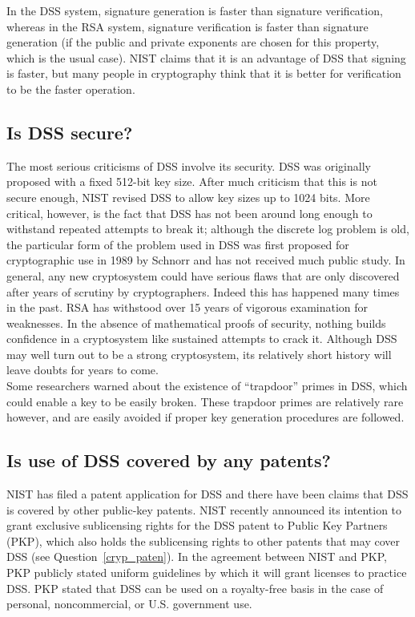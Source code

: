 In the DSS system, signature generation is faster than signature
verification, whereas in the RSA system, signature verification is
faster than signature generation (if the public and private exponents
are chosen for this property, which is the usual case). NIST claims
that it is an advantage of DSS that signing is faster, but many people
in cryptography think that it is better for verification to be the
faster operation.

\subsection{Is DSS secure?}

The most serious criticisms of DSS involve its security. DSS was
originally proposed with a fixed 512-bit key size. After much criticism
that this is not secure enough, NIST revised DSS to allow key sizes up
to 1024 bits. More critical, however, is the fact that DSS has not been
around long enough to withstand repeated attempts to break it; although
the discrete log problem is old, the particular form of the problem
used in DSS was first proposed for cryptographic use in 1989 by Schnorr
and has not received much public study. In general, any new
cryptosystem could have serious flaws that are only discovered after
years of scrutiny by cryptographers. Indeed this has happened many
times in the past. RSA has withstood over 15 years of vigorous
examination for weaknesses. In the absence of mathematical proofs of
security, nothing builds confidence in a cryptosystem like sustained
attempts to crack it. Although DSS may well turn out to be a strong
cryptosystem, its relatively short history will leave doubts for years
to come.\\

Some researchers warned about the existence of ``trapdoor'' primes in
DSS, which could enable a key to be easily broken. These trapdoor
primes are relatively rare however, and are easily avoided if proper
key generation procedures are followed.

\subsection{Is use of DSS covered by any patents?}

NIST has filed a patent application for DSS and there have been claims that
DSS is covered by other public-key patents. NIST recently announced its
intention to grant exclusive sublicensing rights for the DSS patent to
Public Key Partners (PKP), which also holds the sublicensing rights to
other patents that may cover DSS (see Question~\ref{cryp_paten}). In the
agreement between NIST and PKP, PKP publicly stated uniform guidelines by
which it will grant licenses to practice DSS. PKP stated that DSS can be
used on a royalty-free basis in the case of personal, noncommercial, or
U.S. government use.

